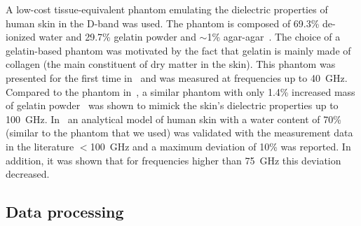 \documentclass[preprint]{rsl}
\begin{document}
A low-cost tissue-equivalent phantom emulating the dielectric properties of human skin in the D-band was used. The phantom is composed of 69.3\% de-ionized water and 29.7\% gelatin powder and $\sim$1\% agar-agar~\cite{aminzadeh2014_ELetters}. The choice of a gelatin-based phantom was motivated by the fact that gelatin is mainly made of collagen (the main constituent of dry matter in the skin). This phantom was presented for the first time in~\cite{aminzadeh2014_ELetters} and was measured at frequencies up to 40~GHz. Compared to the phantom in~\cite{aminzadeh2014_ELetters}, a similar phantom with only 1.4\% increased mass of gelatin powder~\cite{aminzadeh2017_awpl} was shown to mimick the skin's dielectric properties up to 100~GHz. In~\cite{aminzadeh2014_thesis} an analytical model of human skin with a water content of 70\% (similar to the phantom that we used) was validated with the measurement data in the literature $<$100~GHz and a maximum deviation of 10\% was reported. In addition, it was shown that for frequencies higher than 75~GHz this deviation decreased.

\subsection{Data processing}
\end{document}
